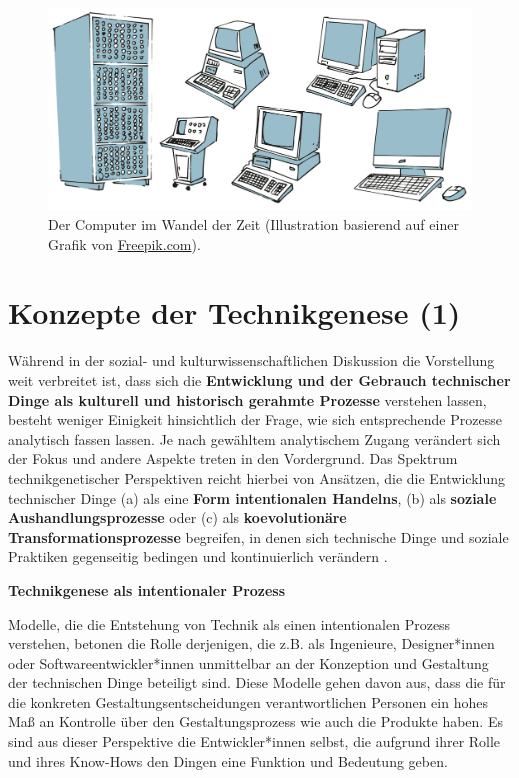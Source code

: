 \documentclass[
  a4paper,
]{book}
\begin{document}
\begin{figure}
\centering
\includegraphics{Figures/06-01-Computer.png}
\caption{\label{fig:fig3}Der Computer im Wandel der Zeit (Illustration basierend auf einer Grafik von \href{https://www.freepik.com/free-vector/computers-evolution-cartoon-vector-concept-vintage-old-computing-stations-retro-system-units-monitors-modern-desktop-pc-with-keyboard-mouse-illustrations-set-isolated-white-background_4393734.htm\#query=computer\%20evolution&position=1&from_view=search&track=robertav1_2_sidr}{Freepik.com}).}
\end{figure}

\section{Konzepte der Technikgenese (1)}\label{konzepte-der-technikgenese-1}

Während in der sozial- und kulturwissenschaftlichen Diskussion die Vorstellung weit verbreitet ist, dass sich die \textbf{Entwicklung und der Gebrauch technischer Dinge als kulturell und historisch gerahmte Prozesse} verstehen lassen, besteht weniger Einigkeit hinsichtlich der Frage, wie sich entsprechende Prozesse analytisch fassen lassen. Je nach gewähltem analytischem Zugang verändert sich der Fokus und andere Aspekte treten in den Vordergrund. Das Spektrum technikgenetischer Perspektiven reicht hierbei von Ansätzen, die die Entwicklung technischer Dinge (a) als eine \textbf{Form intentionalen Handelns}, (b) als \textbf{soziale Aushandlungsprozesse} oder (c) als \textbf{koevolutionäre Transformationsprozesse} begreifen, in denen sich technische Dinge und soziale Praktiken gegenseitig bedingen und kontinuierlich verändern \citep[vgl.][]{fengThinkingDesignCritical2008, shoveDynamicsSocialPractice2012}.

\textbf{Technikgenese als intentionaler Prozess}

Modelle, die die Entstehung von Technik als einen intentionalen Prozess verstehen, betonen die Rolle derjenigen, die z.B. als Ingenieure, Designer*innen oder Softwareentwickler*innen unmittelbar an der Konzeption und Gestaltung der technischen Dinge beteiligt sind. Diese Modelle gehen davon aus, dass die für die konkreten Gestaltungsentscheidungen verantwortlichen Personen ein hohes Maß an Kontrolle über den Gestaltungsprozess wie auch die Produkte haben. Es sind aus dieser Perspektive die Entwickler*innen selbst, die aufgrund ihrer Rolle und ihres Know-Hows den Dingen eine Funktion und Bedeutung geben.
\end{document}
